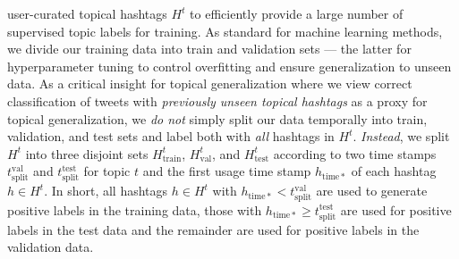 user-curated topical hashtags $H^t$ to efficiently provide a large number of
supervised topic labels for training.  
As standard for machine learning methods, we divide our training data into
train and validation sets --- the latter for hyperparameter tuning to control
overfitting and ensure generalization to unseen data.  
As a critical insight for topical generalization where we view correct classification 
of tweets with \emph{previously unseen topical hashtags} as a proxy for topical generalization, 
we \emph{do not} simply
split our data temporally into train, validation, and test sets and label both with \emph{all} 
hashtags in $H^t$.  \emph{Instead},
we split $H^t$ into three disjoint sets $H^t_\mathrm{train}$, $H^t_\mathrm{val}$, and 
$H^t_\mathrm{test}$ 
according to two time stamps $t^\mathrm{val}_\mathrm{split}$ and $t^\mathrm{test}_\mathrm{split}$ for topic $t$ and the first usage time stamp 
$h_\mathrm{time*}$ of each hashtag $h \in H^t$.  In short, all hashtags $h \in H^t$ with
$h_\mathrm{time*} < t^\mathrm{val}_\mathrm{split}$ are used to generate positive labels in the training data, those with $h_\mathrm{time*} \geq t^\mathrm{test}_\mathrm{split}$ are used for positive labels in the test data and the remainder are used for positive labels in the validation data.

